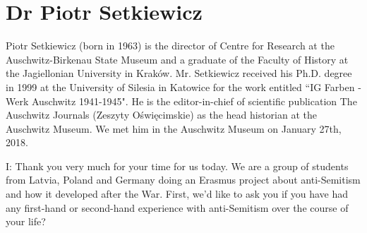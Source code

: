 \section{Dr Piotr Setkiewicz}

Piotr Setkiewicz (born in 1963) is the director of Centre for Research at the Auschwitz-Birkenau State Museum and a graduate of the Faculty of History at the Jagiellonian University in Kraków. Mr. Setkiewicz received his Ph.D. degree in 1999 at the University of Silesia in Katowice for the work entitled “IG Farben - Werk Auschwitz 1941-1945". He is the editor-in-chief of scientific publication The Auschwitz Journals (Zeszyty Oświęcimskie) as the head historian at the Auschwitz Museum. We met him in the Auschwitz Museum on January 27th, 2018. 

I: Thank you very much for your time for us today. We are a group of students from Latvia, Poland and Germany doing an Erasmus project about anti-Semitism and how it developed after the War. First, we'd like to ask you if you have had any first-hand or second-hand experience with anti-Semitism over the course of your life?
